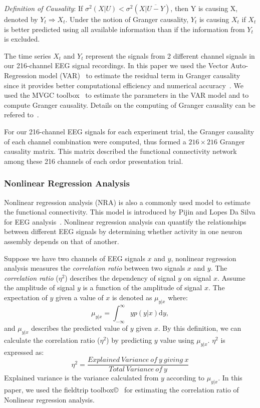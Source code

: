 \emph{Definition of Causality}: If $\sigma^2(X|U)<\sigma^2(X|\overline{U-Y})$, then Y is causing X, denoted by $Y_t \Rightarrow X_t$. Under the notion of Granger causality, $Y_t$ is causing $X_t$ if $X_t$ is better predicted using all available information than if the information from $Y_t$ is excluded.

The time series $X_t$ and $Y_t$ represent the signals from 2 different channel signals in our 216-channel EEG signal recordings. In this paper we used the Vector Auto-Regression model (VAR)~\cite{barnett2014mvgc} to estimate the residual term in Granger causality since it provides better computational efficiency and numerical accuracy~\cite{barnett2014mvgc}. We used the MVGC toolbox~\cite{barnett2014mvgc} to estimate the parameters in the VAR model and to compute Granger causality. Details on the computing of Granger causality can be refered to~\cite{barnett2014mvgc}.

For our 216-channel EEG signals for each experiment trial, the Granger causality of each channel combination were computed, thus formed a $216 \times 216$ Granger causality matrix. This matrix described the functional connectivity network among these 216 channels of each ordor presentation trial. 

\subsubsection{Nonlinear Regression Analysis}
Nonlinear regression analysis (NRA) is also a commonly used model to estimate the functional connectivity. This model is introduced by Pijin and Lopes Da Silva for EEG analysis~\cite{pijn1990localization}. Nonlinear regression analysis can quantify the relationships between different EEG signals by determining whether activity in one neuron assembly depends on that of another.


Suppose we have two channels of EEG signals $x$ and $y$, nonlinear regression analysis measures the \emph{correlation ratio} between two signals $x$ and $y$. The \emph{correlation ratio} ($\eta^2$) describes the dependency of signal $y$ on signal $x$. Assume the amplitude of signal $y$ is a function of the amplitude of signal $x$. The expectation of $y$ given a value of $x$ is denoted as $\mu_{y|x}$ where:
\begin{equation} \label{eq:regressioncurve}
\mu_{y|x} = \int_{-\infty}^{\infty} y p(y|x) \mathrm{d}y,
\end{equation}
and $\mu_{y|x}$ describes the predicted value of $y$ given $x$. By this definition, we can calculate the correlation ratio ($\eta^2$) by predicting $y$ value using $\mu_{y|x}$. $\eta^2$ is expressed as:
\begin{equation} \label{eq:NRAregression}
\eta^2 = \frac{Explained \ Variance \ of \ y \ giving \ x }{Total \ Variance \ of \ y}
\end{equation}
Explained variance is the variance calculated from $y$ according to $\mu_{y|x}$. In this paper, we used the fieldtrip toolbox\copyright~\cite{oostenveld2010fieldtrip} for estimating the correlation ratio of Nonlinear regression analysis. 

